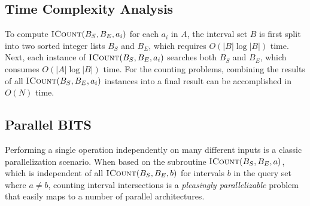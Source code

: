 \documentclass{bioinfo}
\begin{document}
\subsection{Time Complexity Analysis}

To compute $\textsc{ICount}(B_S,B_E,a_i)$ for each $a_i$ in $A$, the interval
set $B$ is first split into two sorted integer lists $B_S$ and $B_E$, which
requires $O(|B| \log |B|)$ time.  Next, each instance of
$\textsc{ICount}(B_S,B_E,a_i)$ searches both $B_S$ and $B_E$, which consumes
$O(|A| \log |B|)$ time.  For the counting problems, combining the results of all
$\textsc{ICount}(B_S,B_E,a_i)$ instances into a final result can be accomplished
in $O(N)$ time.  



\subsection{Parallel BITS}

Performing a single operation independently on many different inputs is a
classic parallelization scenario.  When based on the subroutine
$\textsc{ICount}(B_S,B_E,a)$, which is independent of all
$\textsc{ICount}(B_S,B_E,b)$ for intervals $b$ in the query set where $a \neq
b$, counting interval intersections is a {\em pleasingly parallelizable} problem
that easily maps to a number of parallel architectures.
\end{document}
